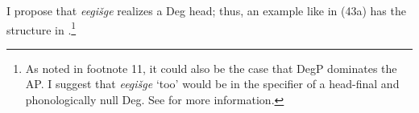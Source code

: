 \documentclass[output=paper]{LSP/langsci}
\begin{document}
\begin{exe}
\ex
\begin{xlist}




\end{xlist}
\end{exe}

I propose that \textit{eegišge} realizes a Deg head; thus, an example like in (43a) has the structure in .\footnote{As noted in footnote 11, it could also be the case that DegP dominates the AP. I suggest that \textit{eegišge} `too' would be in the specifier of a head-final and phonologically null Deg. See \citet{Rosen2015} for more information.}

\begin{exe}
\ex 
{\hspace{1em}}\newline
{}
\end{exe}
\end{document}
